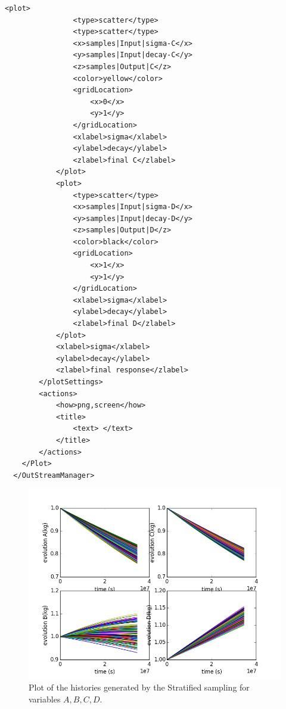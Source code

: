 \begin{enumerate}
\begin{lstlisting}[style=XML,morekeywords={arg,extension,pauseAtEnd,overwrite}]
            <plot>
                <type>scatter</type>
                <type>scatter</type>
                <x>samples|Input|sigma-C</x>
                <y>samples|Input|decay-C</y>
                <z>samples|Output|C</z>
                <color>yellow</color>
                <gridLocation>
                    <x>0</x>
                    <y>1</y>
                </gridLocation>
                <xlabel>sigma</xlabel>
                <ylabel>decay</ylabel>
                <zlabel>final C</zlabel>
            </plot>
            <plot>
                <type>scatter</type>
                <x>samples|Input|sigma-D</x>
                <y>samples|Input|decay-D</y>
                <z>samples|Output|D</z>
                <color>black</color>
                <gridLocation>
                    <x>1</x>
                    <y>1</y>
                </gridLocation>
                <xlabel>sigma</xlabel>
                <ylabel>decay</ylabel>
                <zlabel>final D</zlabel>
            </plot>
            <xlabel>sigma</xlabel>
            <ylabel>decay</ylabel>
            <zlabel>final response</zlabel>
        </plotSettings>
        <actions>
            <how>png,screen</how>
            <title>
                <text> </text>
            </title>
        </actions>
    </Plot>
  </OutStreamManager>
\end{lstlisting}
 \begin{figure}[h!]
  \centering
  \includegraphics[scale=0.7]{pics/Stratified_histories.png}
  \caption{Plot of the histories generated by the Stratified sampling for variables $A,B,C,D$.}

\end{figure}
\end{enumerate}
